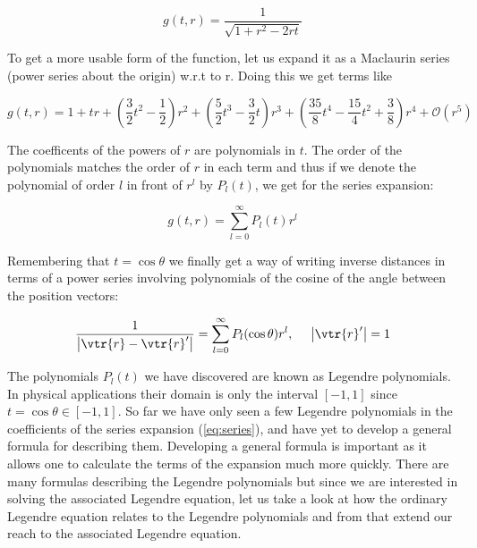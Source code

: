 \documentclass{article}
\begin{document}
    \begin{equation}
        g(t, r) = \frac{1}{\sqrt{1 + r^2 - 2rt}}
    \end{equation}
    
    To get a more usable form of the function, let us expand it as a Maclaurin series (power series about the origin) w.r.t to r. Doing this we get terms like

    \begin{equation}
        \label{eq:series}
        g(t, r) = 1 + tr + \left(\frac{3}{2}t^2 - \frac{1}{2}\right)r^2 + \left(\frac{5}{2}t^3 - \frac{3}{2}t  \right)r^3 + \left( \frac{35}{8}t^4 - \frac{15}{4}t^2 + \frac{3}{8} \right)r^4 + \mathcal{O}(r^5)
    \end{equation}

    The coefficents of the powers of $r$ are polynomials in $t$. The order of the polynomials matches the order of $r$ in each term and thus if we denote the polynomial of order $l$ in front of $r^l$ by
    $P_l(t)$, we get for the series expansion:

    \begin{equation}
        g(t, r) = \sum_{l = 0}^{\infty}P_l(t)r^l
    \end{equation}

    Remembering that $t = \cos\theta$ we finally get a way of writing inverse distances in terms of a power series involving polynomials of the cosine of the angle between the position vectors:

    \begin{equation}
        \frac{1}{\left| \vtr{r} - \vtr{r}' \right|} = \sum_{l = 0}^{\infty}P_l(\cos\theta)r^l, \ \ \ \ \left| \vtr{r}' \right| = 1
    \end{equation}

    The polynomials $P_l(t)$ we have discovered are known as Legendre polynomials. In physical applications their domain is only the interval $[-1, 1]$ since $t = \cos\theta \in [-1, 1]$.
    So far we have only seen a few Legendre polynomials in the coefficients of the series expansion (\ref{eq:series}), and have yet to develop a general formula for describing them. Developing
    a general formula is important as it allows one to calculate the terms of the expansion much more quickly. There are many formulas describing the Legendre polynomials but since we are interested
    in solving the associated Legendre equation, let us take a look at how the ordinary Legendre equation relates to the Legendre polynomials and from that extend our reach to the associated Legendre
    equation.
\end{document}
